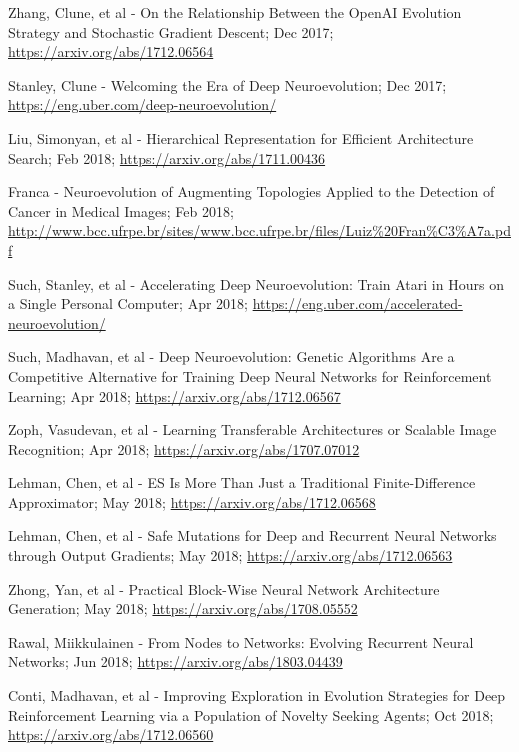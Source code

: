 \documentclass[journal, a4paper]{IEEEtran}
\begin{document}
\begin{thebibliography}{5}
    Zhang, Clune, et al - On the Relationship Between the OpenAI Evolution Strategy and Stochastic Gradient Descent; Dec 2017;
    \url{https://arxiv.org/abs/1712.06564}

    Stanley, Clune - Welcoming the Era of Deep Neuroevolution; Dec 2017;
    \url{https://eng.uber.com/deep-neuroevolution/}

    Liu, Simonyan, et al - Hierarchical Representation for Efficient Architecture Search; Feb 2018;
    \url{https://arxiv.org/abs/1711.00436}

    Franca - Neuroevolution of Augmenting Topologies Applied to the Detection of Cancer in Medical Images; Feb 2018;
    \url{http://www.bcc.ufrpe.br/sites/www.bcc.ufrpe.br/files/Luiz%20Fran%C3%A7a.pdf}

    Such, Stanley, et al - Accelerating Deep Neuroevolution: Train Atari in Hours on a Single Personal Computer; Apr 2018;
    \url{https://eng.uber.com/accelerated-neuroevolution/}

    Such, Madhavan, et al - Deep Neuroevolution: Genetic Algorithms Are a Competitive Alternative for Training Deep Neural Networks for Reinforcement Learning; Apr 2018;
    \url{https://arxiv.org/abs/1712.06567}

    Zoph, Vasudevan, et al - Learning Transferable Architectures or Scalable Image Recognition; Apr 2018;
    \url{https://arxiv.org/abs/1707.07012}

    Lehman, Chen, et al - ES Is More Than Just a Traditional Finite-Difference Approximator; May 2018;
    \url{https://arxiv.org/abs/1712.06568}

    Lehman, Chen, et al - Safe Mutations for Deep and Recurrent Neural Networks through Output Gradients; May 2018;
    \url{https://arxiv.org/abs/1712.06563}

    Zhong, Yan, et al - Practical Block-Wise Neural Network Architecture Generation; May 2018;
    \url{https://arxiv.org/abs/1708.05552}

    Rawal, Miikkulainen - From Nodes to Networks: Evolving Recurrent Neural Networks; Jun 2018;
    \url{https://arxiv.org/abs/1803.04439}

    Conti, Madhavan, et al - Improving Exploration in Evolution Strategies for Deep Reinforcement Learning via a Population of Novelty Seeking Agents; Oct 2018;
    \url{https://arxiv.org/abs/1712.06560}


\end{thebibliography}
\end{document}
